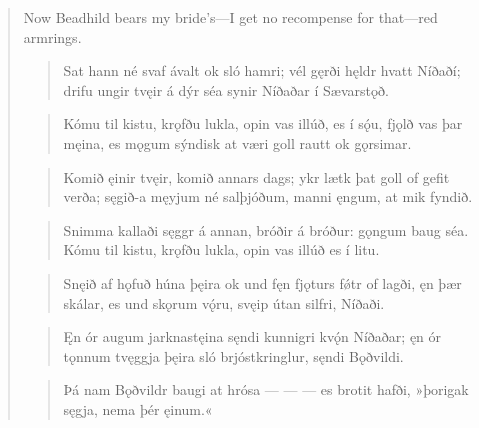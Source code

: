 \begin{verse}
\bvb Now Beadhild bears my bride's—I get no recompense for that—red armrings.

\begin{verse}
\bva Sat hann né svaf ávalt \hld ok sló hamri;
vél gęrði hęldr \hld hvatt Níðaðí;
drifu ungir tvęir \hld á dýr séa
synir Níðaðar \hld í Sævarstǫð. \\%
\end{verse}


\begin{verse}
\bva Kómu til kistu, \hld krǫfðu lukla,
opin vas illúð, \hld es í sǫ́u,
fjǫlð vas þar męina, \hld es mǫgum sýndisk
at væri goll rautt \hld ok gǫrsimar. \\%
\end{verse}


\begin{verse}
\bva Komið ęinir tvęir, \hld komið annars dags;
ykr lætk þat goll \hld of gefit verða;
sęgið-a męyjum \hld né salþjóðum,
manni ęngum, \hld at mik fyndið. \\%
\end{verse}


\begin{verse}
\bva Snimma kallaði \hld sęggr á annan,
bróðir á bróður: \hld gǫngum baug séa.
Kómu til kistu, \hld krǫfðu lukla,
opin vas illúð \hld es í litu. \\%
\end{verse}


\begin{verse}
\bva Snęið af hǫfuð \hld húna þęira
ok und fęn fjǫturs \hld fǿtr of lagði,
ęn þær skálar, \hld es und skǫrum vǫ́ru,
svęip útan silfri,  Níðaði. \\%
\end{verse}


\begin{verse}
\bva Ęn ór augum \hld jarknastęina
sęndi kunnigri \hld kvǫ́n Níðaðar;
ęn ór tǫnnum \hld tvęggja þęira
sló brjóstkringlur, \hld sęndi Bǫðvildi. \\%
\end{verse}


\begin{verse}
\bva Þá nam Bǫðvildr \hld baugi at hrósa
— — — \hld es brotit hafði,
»þorigak sęgja, \hld nema þér ęinum.«  \\%
\end{verse}


\end{verse}
